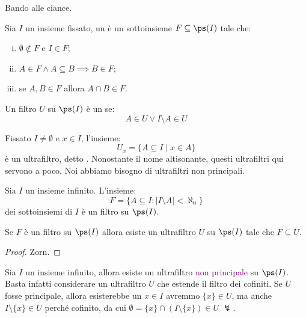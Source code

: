 Bando alle ciance.

\begin{definition}
    Sia $I$ un insieme fissato, un  è un sottoinsieme $F \subseteq \ps(I)$ tale che:
    \begin{enumerate}[(i)]
        \item $\emptyset \notin F$ e $I \in F$;
        \item $A \in F \land A \subseteq B \implies B \in F$;
        \item se $A,B \in F$ allora $A \cap B \in F$.
    \end{enumerate}
    Un filtro $U$ su $\ps(I)$ è un  se:
    \[ A \in U \lor I \setminus A \in U
    \]
\end{definition}

\begin{example}
    Fissato $I \ne \emptyset$ e $x \in I$, l'insieme:
    \[ U_x = \{ A \subseteq I \mid x \in A \}
    \]
    è un ultrafiltro, detto . Nonostante il nome altisonante, questi ultrafiltri qui servono a poco.
    Noi abbiamo bisogno di ultrafiltri non principali.
\end{example}

\begin{example}
    Sia $I$ un insieme infinito. L'insieme:
    \[ F = \{ A \subseteq I : |I \setminus A| < \aleph_0 \}
    \]
    dei sottoinsiemi  di $I$ è un filtro su $\ps(I)$.
\end{example}

\begin{proposition}
    Se $F$ è un filtro su $\ps(I)$ allora esiste un ultrafiltro $U$ su $\ps(I)$ tale che $F \subseteq U$.
\end{proposition}

\begin{proof}
    Zorn.
\end{proof}

\begin{example}
    Sia $I$ un insieme infinito, allora esiste un ultrafiltro \textcolor{purple}{non principale} su $\ps(I)$. Basta infatti considerare 
    un ultrafiltro $U$ che estende il filtro dei cofiniti. Se $U$ fosse principale, allora esisterebbe un $x \in I$ avremmo $\{x\} \in U$,
    ma anche $I \setminus \{x\} \in U$ perché cofinito, da cui $\emptyset = \{x\} \cap (I \setminus \{x\}) \in U \; \lightning$.
\end{example}

